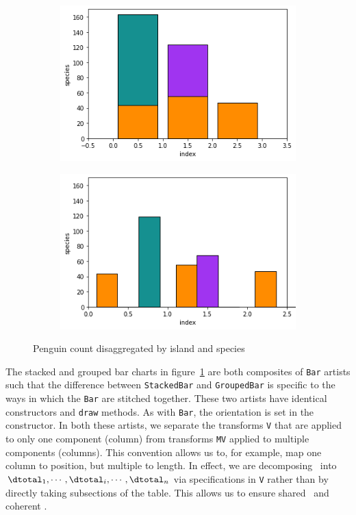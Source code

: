 \documentclass[../main.tex]{subfiles}
\begin{document}
\begin{figure}[H]
    \begin{subfigure}{0.49\textwidth}
        \includegraphics[width=\textwidth]{figures/code/bar_stacked.png}
        \caption{}
    \end{subfigure}
    \begin{subfigure}{0.49\textwidth}
        \includegraphics[width=\textwidth]{figures/code/bar_grouped.png}
        \caption{}
    \end{subfigure}
    \caption{Penguin count disaggregated by island and species}
    \label{fig:code_bar_multi}
\end{figure}
The stacked and grouped bar charts in figure~\ref{fig:code_bar_multi} are both composites of \texttt{Bar} artists such that the difference between \texttt{StackedBar} and \texttt{GroupedBar} is specific to the ways in which the \texttt{Bar} are stitched together. These two artists have identical constructors and \texttt{draw} methods. As with \texttt{Bar}, the orientation is set in the constructor. In both these artists, we separate the transforms \texttt{V}  that are applied to only one component (column) from transforms  \texttt{MV} applied to multiple components (columns). This convention allows us to, for example, map one column to position, but multiple to length. In effect, we are decomposing \dtotal\ into $\dtotal_1, \cdots, \dtotal_i, \cdots, \dtotal_n$ via specifications in \texttt{V} rather than by directly taking subsections of the table. This allows us to ensure shared \dbase\ and coherent \dsection.
\end{document}
